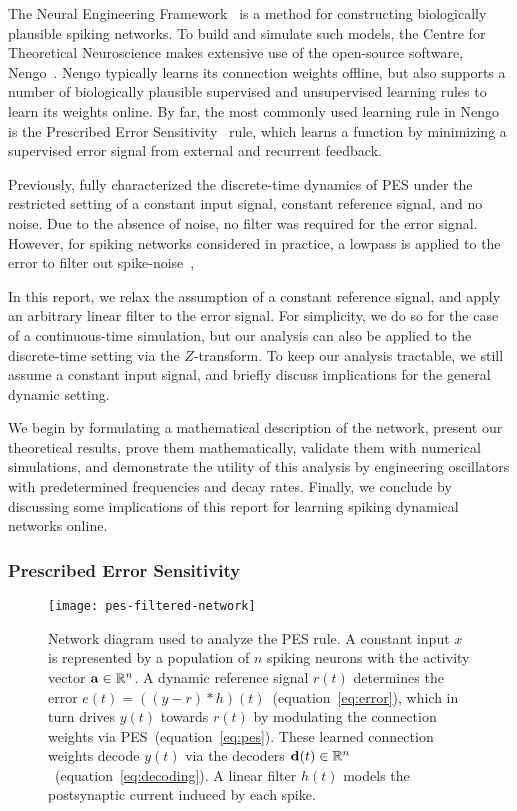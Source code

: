 The Neural Engineering Framework~\citep[NEF;][]{eliasmith2003a} is a method for constructing biologically plausible spiking networks.
To build and simulate such models, the Centre for Theoretical Neuroscience makes extensive use of the open-source software, Nengo~\citep{bekolay2014}. 
Nengo typically learns its connection weights offline, but also supports a number of biologically plausible supervised and unsupervised learning rules to learn its weights online.
By far, the most commonly used learning rule in Nengo is the Prescribed Error Sensitivity~\citep[PES;][]{bekolay2013} rule, which learns a function by minimizing a supervised error signal from external and recurrent feedback.

Previously, \citet{voelker2015} fully characterized the discrete-time dynamics of PES under the restricted setting of a constant input signal, constant reference signal, and no noise.
Due to the absence of noise, no filter was required for the error signal.
However, for spiking networks considered in practice, a lowpass is applied to the error to filter out spike-noise~\citep[e.g.,][]{dewolf2016, rasmussen2017},  

In this report, we relax the assumption of a constant reference signal, and apply an arbitrary linear filter to the error signal.
For simplicity, we do so for the case of a continuous-time simulation, but our analysis can also be applied to the discrete-time setting via the $Z$-transform.
To keep our analysis tractable, we still assume a constant input signal, and briefly discuss implications for the general dynamic setting.

We begin by formulating a mathematical description of the network, present our theoretical results, prove them mathematically, validate them with numerical simulations, and demonstrate the utility of this analysis by engineering oscillators with predetermined frequencies and decay rates.
Finally, we conclude by discussing some implications of this report for learning spiking dynamical networks online.

\subsubsection{Prescribed Error Sensitivity}

\begin{figure}
\centering
\texttt{[image: pes-filtered-network]}
\caption{\label{fig:pes-filtered-network}
  Network diagram used to analyze the PES rule.
  A constant input $x$ is represented by a population of $n$ spiking neurons with the activity vector $\mathbf{a} \in \mathbb{R}^n$.
  A dynamic reference signal $r(t)$ determines the error $e(t) = \left((y - r) \ast h\right)(t)$~(equation~\ref{eq:error}), which in turn drives $y(t)$ towards $r(t)$ by modulating the connection weights via PES~(equation~\ref{eq:pes}).
  These learned connection weights decode $y(t)$ via the decoders $\mathbf{d}(t) \in \mathbb{R}^n$~(equation~\ref{eq:decoding}).
  A linear filter $h(t)$ models the postsynaptic current induced by each spike.
}
\end{figure}


